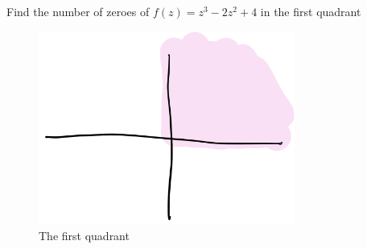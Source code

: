 \begin{example}
    Find the number of zeroes of $f(z) = z^3 - 2z^2 + 4$ in the first quadrant
    \begin{figure}[H]
        \centering
        \includegraphics[width=0.75\textwidth]{LECTURE_13/first-quadrant.png}
        \caption{The first quadrant}
    \end{figure}


\end{example}
